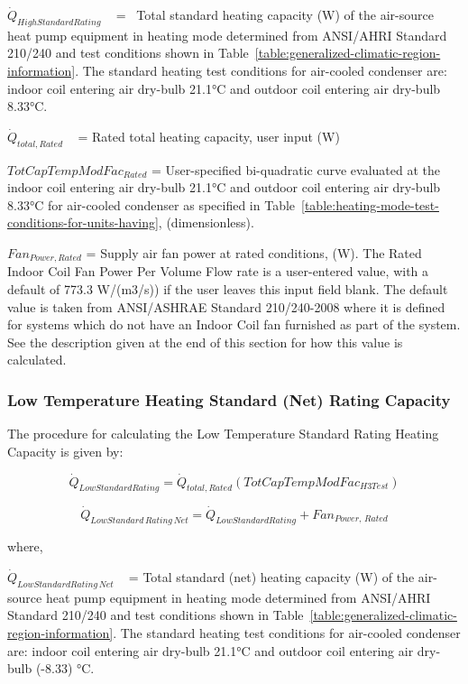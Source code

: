 \({\dot Q_{HighStandardRating}}\) ~ = ~Total standard heating capacity (W) of the air-source heat pump equipment in heating mode determined from ANSI/AHRI Standard 210/240 and test conditions shown in Table~\ref{table:generalized-climatic-region-information}. The standard heating test conditions for air-cooled condenser are: indoor coil entering air dry-bulb 21.1°C and outdoor coil entering air dry-bulb 8.33°C.

\({\dot Q_{total,Rated}}\) ~ = Rated total heating capacity, user input (W)

\(TotCapTempModFa{c_{Rated}}\) = User-specified bi-quadratic curve evaluated at the indoor coil entering air dry-bulb 21.1°C and outdoor coil entering air dry-bulb 8.33°C for air-cooled condenser as specified in Table~\ref{table:heating-mode-test-conditions-for-units-having}, (dimensionless).

\(Fa{n_{Power,Rated}}\) = Supply air fan power at rated conditions, (W). The Rated Indoor Coil Fan Power Per Volume Flow rate is a user-entered value, with a default of 773.3 W/(m3/s)) if the user leaves this input field blank. The default value is taken from ANSI/ASHRAE Standard 210/240-2008 where it is defined for systems which do not have an Indoor Coil fan furnished as part of the system. See the description given at the end of this section for how this value is calculated.

\subsubsection{Low Temperature Heating Standard (Net) Rating Capacity}\label{low-temperature-heating-standard-net-rating-capacity}

The procedure for calculating the Low Temperature Standard Rating Heating Capacity is given by:

\begin{equation}
{\dot Q_{LowStandardRating}} = {\dot Q_{total,Rated}}\left( {TotCapTempModFa{c_{H3Test}}} \right)
\end{equation}

\begin{equation}
{\dot Q_{LowStandard\,Rating\,Net}} = {\dot Q_{LowStandardRating}} + Fa{n_{Power,\,Rated}}
\end{equation}

where,

\({\dot Q_{LowStandardRating\,Net}}\) ~ = Total standard (net) heating capacity (W) of the air-source heat pump equipment in heating mode determined from ANSI/AHRI Standard 210/240 and test conditions shown in Table~\ref{table:generalized-climatic-region-information}. The standard heating test conditions for air-cooled condenser are: indoor coil entering air dry-bulb 21.1°C and outdoor coil entering air dry-bulb (-8.33) °C.


